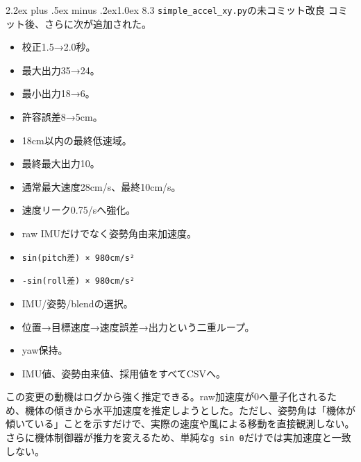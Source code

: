 \documentclass[10pt,a4paper,openany]{ltjsbook}
\makeatletter
\renewcommand\section{\@startsection{section}{1}{0pt}%
  {2.2ex plus .5ex minus .2ex}{1.0ex}%
  {\sffamily\Large\bfseries\color{ReportNavy}}}
\makeatother
\begin{document}
\section{8.3 \texttt{simple\_accel\_xy.py}の未コミット改良}
コミット後、さらに次が追加された。\par
\begin{itemize}
\item 校正1.5→2.0秒。
\item 最大出力35→24。
\item 最小出力18→6。
\item 許容誤差8→5cm。
\item 18cm以内の最終低速域。
\item 最終最大出力10。
\item 通常最大速度28cm/s、最終10cm/s。
\item 速度リーク0.75/sへ強化。
\item raw IMUだけでなく姿勢角由来加速度。
\item \texttt{sin(pitch差) × 980cm/s²}
\item \texttt{-sin(roll差) × 980cm/s²}
\item IMU/姿勢/blendの選択。
\item 位置→目標速度→速度誤差→出力という二重ループ。
\item yaw保持。
\item IMU値、姿勢由来値、採用値をすべてCSVへ。
\end{itemize}
この変更の動機はログから強く推定できる。raw加速度が0へ量子化されるため、機体の傾きから水平加速度を推定しようとした。ただし、姿勢角は「機体が傾いている」ことを示すだけで、実際の速度や風による移動を直接観測しない。さらに機体制御器が推力を変えるため、単純な\texttt{g sin θ}だけでは実加速度と一致しない。\par
\end{document}

